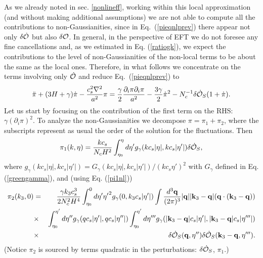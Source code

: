 \documentclass[11pt,amsmath,floats,floatfix,nofootinbib,secnumarabic, superscriptaddress, tightenlines]{revtex4}
\newcommand{\beq}{\begin{equation}}
\newcommand{\eeq}{\end{equation}}
\newcommand{\be}{\begin{equation}}
\newcommand{\ee}{\end{equation}}
\newcommand{\calo}{{\cal O}}
\begin{document}
{As we already noted in sec. \ref{nonlineff}, working within this local approximation (and without making additional assumptions) we
are not able to compute all the contributions to non-Gaussianities, since in Eq.~(\ref{pieqnlprev}) there appear  not only
 $\delta\dot{\calo}$ but also ${\delta\calo}$. In general, in the perspective of EFT we do not foresee any fine cancellations and,
as we estimated in Eq. (\ref{ratiogk}), we expect  the contributions to the level of non-Gaussianities of the non-local terms
to be about the same as the local ones. Therefore, in what follows we concentrate on the terms involving only $\dot{\calo}$ and reduce Eq.~(\ref{pieqnlprev}) to
\beq
\ddot\pi + (3H+\gamma)\dot\pi  - \frac{c_s^2\nabla^2}{a^2}\pi =\frac{\gamma}{2}\frac{\partial_i\pi\partial_i\pi}{a^2}-\frac{3\gamma}{2}\dot{\pi}^2 -N^{-1}_c\delta\dot{\calo}_S (1+\dot{\pi}).\label{pieqnl}
\eeq
Let us start by focusing on the contribution of the first term on the RHS: $\gamma (\partial_i\pi)^2$. To analyze the non-Gaussianities we  decompose $\pi=\pi_1+\pi_2$, where the subscripts represent as usual the order of the solution for the fluctuations. Then
\be\label{pi1nl}\pi_1(k,\eta)=\frac{ k c_s}{N_cH^2}\int^{\eta}_{\eta_0} d\eta' g_{\gamma}(k c_s|\eta|,k c_s|\eta'|) \delta\dot{ \calo}_S,\ee where
$g_{\gamma}(k c_s|\eta|,k c_s|\eta'|)=G_{\gamma}(k c_s|\eta|,k c_s|\eta'|)/(k c_s{\eta'})^2$ with $G_{\gamma}$ defined in Eq. (\ref{greengamma}),
and (using Eq. (\ref{pi1nl}))
\begin{eqnarray}
\pi_2(k_3,0)&=&\frac{\gamma k_3 c_s^3}{2 N_c^2H^4} \int^0_{\eta_0} d\eta' {\eta'}^2  g_{\gamma}(0,k_3c_s|\eta'|)\int\frac{d^3{\bf q}}{(2\pi)^3} |{\bf q}|  |{\bf k}_3-{\bf q}| ({\bf q}\cdot({\bf k}_3-{\bf q}))\nonumber\\
&\times&\int^{\eta'}_{\eta_0} d\eta'' g_{\gamma}(qc_s|\eta'|,qc_s|\eta''|) \int^{\eta'}_{\eta_0} d\eta''' g_{\gamma}(|{\bf k}_3-{\bf q}| c_s|\eta'|,|{\bf k}_3-{\bf q}| c_s|\eta'''|) \nonumber\\&\times&\delta\dot{\calo}_S({\bf q},\eta'')\delta\dot{\calo}_S({\bf k}_3-{\bf q},\eta''').\label{pi2nl}
\end{eqnarray}
(Notice $\pi_2$ is sourced by terms quadratic in the perturbations: $\delta\dot{\calo}_S$, $\pi_1$.) \\

}
\end{document}
